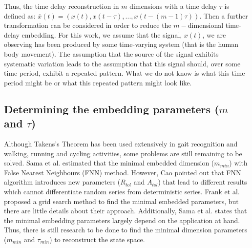 \documentclass{sigchi}
\begin{document}
Thus, the time delay reconstruction in $m$ dimensions with a time delay
$\tau$ is defined as:
$\overline{x}(t) = (x(t), x(t-\tau),...,x(t-(m-1)\tau))$.
Then a further transformation can be considered
in order to reduce
the $m-$dimensional time-delay embedding.
For this work, we assume that the signal, $x(t)$, we are observing has been
produced by some time-varying system (that is the human body movement).
The assumption that the source of the signal exhibits systematic variation
leads to the assumption that this signal should, over some time period,
exhibit a repeated pattern. What we do not know is what this time period might
be or what this repeated pattern might look like.


%



\subsection{Determining the embedding parameters ($m$ and $\tau$)}
Although Takens's Theorem has been used extensively in gait
recognition and walking, running and cycling activities,
some problems are still remaining to be solved.
Sama et al. \cite{Sama2013} estimated that the minimal embedded
dimension ($m_{min}$) with False Nearest Neighbours (FNN) method.
However, Cao \cite{Cao1997} pointed out that FNN algorithm
introduces new parameters ($R_{tol}$ and $A_{tol}$) that lead
to different results which cannot differentiate random series from
deterministic series.
Frank et al. \cite{Frank2010} proposed a grid search method to find the minimal
embedded parameters, but there are little details about their approach.
Additionally, Sama et al. \cite{Sama2013} states that the minimal embedding
parameters largely depend on the
application at hand. Thus, there is still research to be done to find the
minimal dimension parameters ($m_{min}$ and $\tau_{min}$)
to reconstruct the state space.
\end{document}
